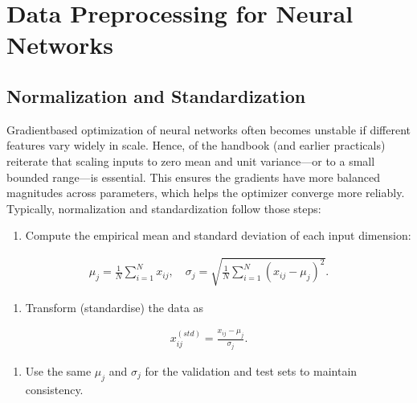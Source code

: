 \documentclass[letterpaper,10pt,english]{jupyterBook}
\begin{document}
\section{Data Preprocessing for Neural Networks}
\label{\detokenize{04:data-preprocessing-for-neural-networks}}

\subsection{Normalization and Standardization}
\label{\detokenize{04:normalization-and-standardization}}
\sphinxAtStartPar
Gradient\sphinxhyphen{}based optimization of neural networks often becomes unstable if different features vary widely in scale. Hence,  of the handbook (and earlier practicals) reiterate that scaling inputs to zero mean and unit variance—or to a small bounded range—is essential. This ensures the gradients have more balanced magnitudes across parameters, which helps the optimizer converge more reliably. Typically, normalization and standardization follow those steps:
\begin{enumerate}
%
\item {} 
\sphinxAtStartPar
Compute the empirical mean and standard deviation of each input dimension:

\end{enumerate}
\begin{equation*}
\begin{split}
\mu_j = \frac{1}{N} \sum_{i=1}^N x_{ij}, \quad
\sigma_j = \sqrt{\frac{1}{N}\sum_{i=1}^N (x_{ij}-\mu_j)^2}.
\end{split}
\end{equation*}\begin{enumerate}
%
\setcounter{enumi}{1}
\item {} 
\sphinxAtStartPar
Transform (standardise) the data as

\end{enumerate}
\begin{equation*}
\begin{split}
x_{ij}^{(std)} = \frac{x_{ij} - \mu_j}{\sigma_j}.
\end{split}
\end{equation*}\begin{enumerate}
%
\setcounter{enumi}{2}
\item {} 
\sphinxAtStartPar
Use the same \(\mu_j\) and \(\sigma_j\) for the validation and test sets to maintain consistency.

\end{enumerate}
\end{document}
